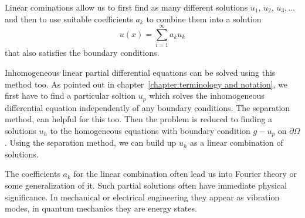 Linear cominations allow us to first find as many different solutions
$u_1$, $u_2$, $u_3,\dots$ and then to use suitable coefficients $a_k$
to combine them into a solution
\[
u(x)=\sum_{i=1}^\infty a_ku_k
\]
that also satisfies the boundary conditions.

Inhomogeneous linear partial differential equations can be solved using
this method too.
As pointed out in chapter~\ref{chapter:terminology and notation},
we first have to find a particular soltion
$u_p$ which solves the inhomogeneous differential equation independently
of any boundary conditions.
The separation method, can helpful for this too.
Then the problem is reduced to finding a solutions $u_h$ to the homogeneous
equations with boundary condition $g-u_p$ on $\partial\Omega$.
Using the separation method, we can build up $u_h$ as a linear combination
of solutions.

The coefficients $a_k$ for the linear combination often lead us into
Fourier theory or some generalization of it.
Such partial solutions often have immediate physical significance.
In mechanical or electrical engineering they appear as vibration modes,
in quantum mechanics they are energy states.


